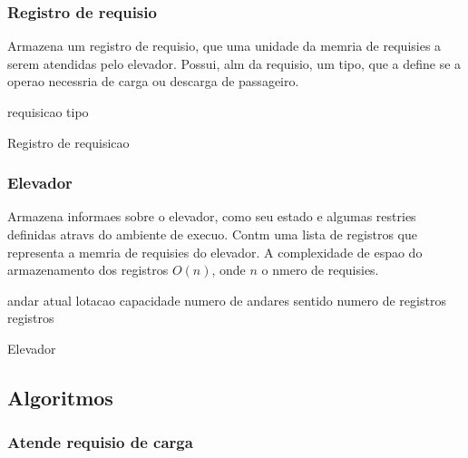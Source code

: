\documentclass[12pt]{article}
\begin{document}
\subsubsection{Registro de requisio}

Armazena um registro de requisio, que  uma unidade da memria de requisies a serem atendidas pelo elevador. Possui, alm da requisio, um tipo, que a define se a operao necessria  de carga ou descarga de passageiro.
\begin{algorithm}[h!]
\begin{footnotesize}

	requisicao\;
	tipo\;

\caption{Registro de requisicao}%
\end{footnotesize}
\end{algorithm}


\subsubsection{Elevador}

Armazena informaes sobre o elevador, como seu estado e algumas restries definidas atravs do ambiente de execuo. Contm uma lista de registros que representa a memria de requisies do elevador. A complexidade de espao do armazenamento dos registros  $O(n)$, onde $n$  o nmero de requisies.
\begin{algorithm}[h!]
\begin{footnotesize}

	andar atual\;
	lotacao\;
	capacidade\;
	numero de andares\;
	sentido\;
	numero de registros\;
	registros\;

\caption{Elevador}%
\end{footnotesize}
\end{algorithm}


\subsection{Algoritmos}

\subsubsection{Atende requisio de carga}
\end{document}
